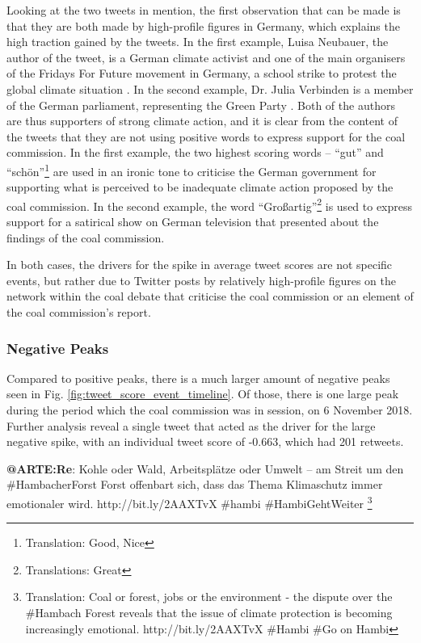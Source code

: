 \documentclass[12pt,onecolumn,twoside]{layout}
\begin{document}
Looking at the two tweets in mention, the first observation that can be made is that they are both made by high-profile figures in Germany, which explains the high traction gained by the tweets. In the first example, Luisa Neubauer, the author of the tweet, is a German climate activist and one of the main organisers of the Fridays For Future movement in Germany, a school strike to protest the global climate situation \cite{FF20, FF20G}. In the second example, Dr. Julia Verbinden is a member of the German parliament, representing the Green Party \cite{Bundestag2020}. Both of the authors are thus supporters of strong climate action, and it is clear from the content of the tweets that they are not using positive words to express support for the coal commission. In the first example, the two highest scoring words -- ``gut'' and ``schön''\footnote{Translation: Good, Nice} are used in an ironic tone to criticise the German government for supporting what is perceived to be inadequate climate action proposed by the coal commission. In the second example, the word ``Großartig''\footnote{Translations: Great} is used to express support for a satirical show on German television that presented about the findings of the coal commission. 

In both cases, the drivers for the spike in average tweet scores are not specific events, but rather due to Twitter posts by relatively high-profile figures on the network within the coal debate that criticise the coal commission or an element of the coal commission's report. 

\subsubsection*{Negative Peaks} %
Compared to positive peaks, there is a much larger amount of negative peaks seen in Fig. \ref{fig:tweet_score_event_timeline}. Of those, there is one large peak during the period which the coal commission was in session, on 6 November 2018. Further analysis reveal a single tweet that acted as the driver for the large negative spike, with an individual tweet score of -0.663, which had 201 retweets. 

\begin{displayquote}
	\textbf{@ARTE:Re}: Kohle oder Wald, Arbeitsplätze oder Umwelt – am Streit um den \#HambacherForst Forst offenbart sich, dass das Thema Klimaschutz immer emotionaler wird. http://bit.ly/2AAXTvX \#hambi \#HambiGehtWeiter
	\footnote{Translation: Coal or forest, jobs or the environment - the dispute over the \#Hambach Forest reveals that the issue of climate protection is becoming increasingly emotional. http://bit.ly/2AAXTvX \#Hambi \#Go on Hambi}
\end{displayquote}
\end{document}
